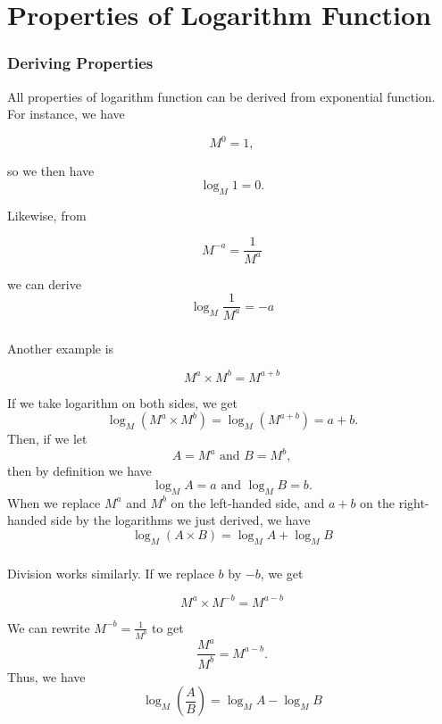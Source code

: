 \section[Properties]{Properties of Logarithm Function}
\frame{\sectionpage}

\begin{frame}[t]
  \frametitle{Deriving Properties}
  All properties of logarithm function can be derived from exponential function. For instance, we have
  \begin{block}{}
    \[M^0 = 1,\]
  \end{block}
  \begin{slide}
    so we then have
    \[\log_M 1 = 0.\]

    Likewise, from
    \begin{block}{}
      \[M^{-a} = \frac{1}{M^a}\]
    \end{block}
    we can derive
    \[\log_M \frac{1}{M^a} = -a\]
  \end{slide}
\end{frame}

\begin{frame}[t]
  \frametitle{}
  Another example is
  \begin{block}{}
    \[M^a \times M^b = M^{a+b}\]
  \end{block}
  \begin{slide}
    If we take logarithm on both sides, we get
    \[\log_M (M^a \times M^b) = \log_M (M^{a+b}) = a+b.\]
    Then, if we let
    \[A = M^a \text{ and } B = M^b,\]
    then by definition we have
    \[\log_M A = a \text{ and } \log_M B = b.\]
    When we replace $M^a$ and $M^b$ on the left-handed side, and $a+b$ on the right-handed side by the logarithms we just derived, we have
    \[\log_M (A \times B) = \log_M A + \log_M B\]
  \end{slide}
\end{frame}

\begin{frame}[t]
  \frametitle{}
  Division works similarly. If we replace $b$ by $-b$, we get
  \begin{block}{}
    \[M^a \times M^{-b} = M^{a-b}\]
  \end{block}
  \begin{slide}
    We can rewrite $M^{-b} = \frac{1}{M^b}$ to get
    \[\frac{M^a}{M^b} = M^{a-b}.\]
    Thus, we have
    \[\log_M \left( \frac{A}{B} \right) = \log_M A - \log_M B\]
  \end{slide}
\end{frame}

